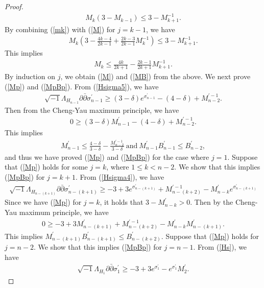 \documentclass[10pt,a4paper]{amsart}
\def\inum{{\sqrt{-1}}}
\begin{document}
\begin{proof}
\begin{align}
M_k(3-M_{k-1})\leq 3-M_{k+1}^{-1}. \label{mk}
\end{align}
By combining (\ref{mk}) with (\ref{M}) for $j=k-1$, we have
\begin{align*}
M_k\left(3-\frac{4k-4}{2k-1}+\frac{2k-3}{2k-1}M_k^{-1}\right)\leq 3-M_{k+1}^{-1}.
\end{align*}
This implies
\begin{align*}
M_k \leq \frac{4k}{2k+1}-\frac{2k-1}{2k+1}M_{k+1}^{-1}.
\end{align*} 
By induction on $j$, we obtain (\ref{M}) and (\ref{MB}) from the above. We next prove (\ref{Mp}) and (\ref{MpBp}). From (\ref{Hsigma5}), we have 
\begin{align*}
\inum \Lambda_{H_{n-1}}\partial \bar{\partial} \sigma^\prime_{n-1}\geq (3-\delta)e^{\sigma_{n-1}^\prime}-(4-\delta)+M_{n-2}^{\prime-1}. 
\end{align*}
Then from the Cheng-Yau maximum principle, we have
\begin{align*}
0\geq (3-\delta)M_{n-1}^\prime-(4-\delta)+M_{n-2}^{\prime-1}.
\end{align*}
This implies
\begin{align*}
M_{n-1}^\prime\leq \frac{4-\delta}{3-\delta}-\frac{M_{n-2}^{\prime-1}}{3-\delta} \ \text{and} \
M_{n-1}^\prime B_{n-1}^\prime\leq B_{n-2}^\prime,
\end{align*}
and thus we have proved (\ref{Mp}) and (\ref{MpBp}) for the case where $j=1$. Suppose that (\ref{Mp}) holds for some $j=k$, where $1\leq k<n-2$. We show that this implies (\ref{MpBp}) for $j=k+1$. From (\ref{Hsigma4}), we have
\begin{align*}
\inum \Lambda_{H_{n-(k+1)}}\partial \bar{\partial} \sigma^\prime_{n-(k+1)}\geq -3+3e^{\sigma_{n-(k+1)}^\prime}+M_{n-(k+2)}^{\prime-1}-M_{n-k}^\prime e^{\sigma_{n-(k+1)}^\prime}
\end{align*}
Since we have (\ref{Mp}) for $j=k$, it holds that $3-M_{n-k}^\prime>0$. Then by the Cheng-Yau maximum principle, we have
\begin{align*}
0\geq -3+3M_{n-(k+1)}^\prime+M_{n-(k+2)}^{\prime-1}-M_{n-k}^\prime M_{n-(k+1)}^\prime.
\end{align*}
This implies $M_{n-(k+1)}^\prime B_{n-(k+1)}^\prime\leq B_{n-(k+2)}^\prime$. Suppose that (\ref{Mp}) holds for $j=n-2$. We show that this implies (\ref{MpBp}) for $j=n-1$. From (\ref{Hs}), we have 
\begin{align*}
\inum \Lambda_{H_1}\partial \bar{\partial} \sigma^\prime_1\geq -3+3e^{\sigma_1^\prime}-e^{\sigma_1^\prime}M_2^\prime.

\end{align*}
\end{proof}
\end{document}
